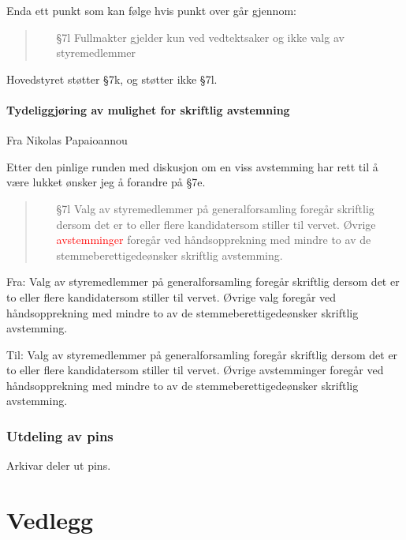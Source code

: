 \documentclass[10pt,norsk,a4paper]{article}
\begin{document}
\begin{minipage}[t]{0.49\textwidth}
Enda ett punkt som kan følge hvis punkt over går gjennom:

\begin{quote}
    \begin{enumerate}
        \item[§7l] Fullmakter gjelder kun ved vedtektsaker og ikke valg av styremedlemmer
    \end{enumerate}
\end{quote}

Hovedstyret støtter §7k, og støtter ikke §7l.

\subsection{Tydeliggjøring av mulighet for skriftlig avstemning}
Fra Nikolas Papaioannou

Etter den pinlige runden med diskusjon om en viss avstemming har rett til å være lukket ønsker jeg å forandre på §7e.
\begin{quote}
    \begin{enumerate}
        \item[§7l]
        Valg av styremedlemmer på generalforsamling foregår skriftlig dersom
        det er to eller flere kandidatersom stiller til vervet. Øvrige
        \textcolor{red}{avstemminger} foregår ved håndsopprekning med mindre
        to av de stemmeberettigedeønsker skriftlig avstemming.
    \end{enumerate}
\end{quote}

Fra:
Valg av styremedlemmer på generalforsamling foregår skriftlig dersom det er to eller flere kandidatersom stiller til vervet.
Øvrige valg foregår ved håndsopprekning med mindre to av de stemmeberettigedeønsker skriftlig avstemming.

Til:
Valg av styremedlemmer på generalforsamling foregår skriftlig dersom det er to eller flere kandidatersom stiller til vervet.
Øvrige avstemminger foregår ved håndsopprekning med mindre to av de stemmeberettigedeønsker skriftlig avstemming.

\end{minipage}

\newpage

\section{Utdeling av pins}

Arkivar deler ut pins.


\part*{Vedlegg}\label{lastpage}

\newpage
{}

\end{document}
